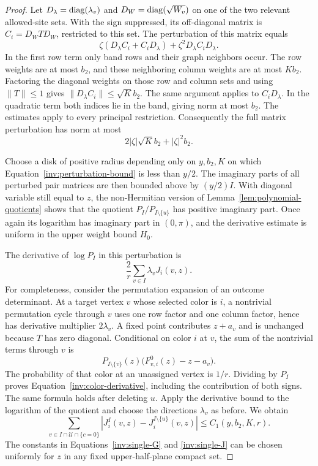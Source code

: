 \begin{proof}
Let $D_\lambda=\operatorname{diag}(\lambda_v)$ and $D_W=\operatorname{diag}(\sqrt{W_v})$ on one
of the two relevant allowed-site sets.  With the sign suppressed, its
off-diagonal matrix is $C_i=D_W T D_W$, restricted to this set.  The
perturbation of this matrix equals
\[
 \zeta(D_\lambda C_i+C_iD_\lambda)
              +\zeta^2D_\lambda C_iD_\lambda.
\]
In the first row term only band rows and their graph neighbors occur.
The row weights are at most $b_2$, and these neighboring column weights
are at most $Kb_2$.  Factoring the diagonal weights on those row and
column sets and using $\|T\|\leq1$ gives
$\|D_\lambda C_i\|\leq\sqrt K b_2$.
The same argument applies to $C_iD_\lambda$.  In the quadratic term both
indices lie in the band, giving norm at most $b_2$.  The estimates apply
to every principal restriction.  Consequently the full matrix
perturbation has norm at most
\begin{equation}\label{inv:perturbation-bound}
             2|\zeta|\sqrt K b_2+|\zeta|^2b_2.
\end{equation}

Choose a disk of positive radius depending only on $y,b_2,K$ on which
Equation~\eqref{inv:perturbation-bound} is less than $y/2$.  The imaginary
parts of all perturbed pair matrices are then bounded above by
$(y/2)I$.  With diagonal variable still equal to $z$, the non-Hermitian
version of Lemma~\ref{lem:polynomial-quotients} shows that the quotient
$P_I/P_{I\setminus\{u\}}$ has positive imaginary part.  Once again its
logarithm has imaginary part in $(0,\pi)$, and the derivative estimate
is uniform in the upper weight bound $H_0$.

The derivative of $\log P_I$ in this perturbation is
\begin{equation}\label{inv:color-derivative}
               \frac2r\sum_{v\in I}\lambda_vJ_i(v,z).
\end{equation}
For completeness, consider the permutation expansion of an outcome
determinant.  At a target vertex $v$ whose selected color is $i$, a
nontrivial permutation cycle through $v$ uses one row factor and one
column factor, hence has derivative multiplier $2\lambda_v$.
A fixed point contributes $z+a_v$ and is unchanged because $T$ has zero
diagonal.  Conditional on color $i$ at $v$, the sum of the nontrivial
terms through $v$ is
\[
 P_{I\setminus\{v\}}(z)
       \bigl(F_{v,i}^0(z)-z-a_v\bigr).
\]
The probability of that color at an unassigned vertex is $1/r$.
Dividing by $P_I$ proves Equation~\eqref{inv:color-derivative}, including
the contribution of both signs.  The same formula holds after deleting
$u$.  Apply the derivative bound to the logarithm of the quotient and
choose the directions $\lambda_v$ as before.  We obtain
\begin{equation}\label{inv:single-J}
 \sum_{v\in I\cap\mathcal U\cap\{c=0\}}
       |J_i^{I}(v,z)-J_i^{I\setminus\{u\}}(v,z)|
       \leq C_1(y,b_2,K,r).
\end{equation}
The constants in Equations~\eqref{inv:single-G} and
\eqref{inv:single-J} can be chosen uniformly for $z$ in any fixed
upper-half-plane compact set.


\end{proof}
